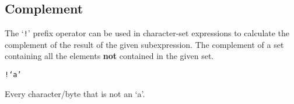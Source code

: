 
\subsection{Complement}
{
	The `\texttt{!}' prefix operator can be used in character-set expressions
	to calculate the complement of the result of the given subexpression. The
	complement of a set containing all the elements \textbf{not} contained in
	the given set.
	
	\begin{itemize}
	{
		\item[] \texttt{!{}`a'}
		
			Every character/byte that is not an `a'.
	}
	\end{itemize}
}
